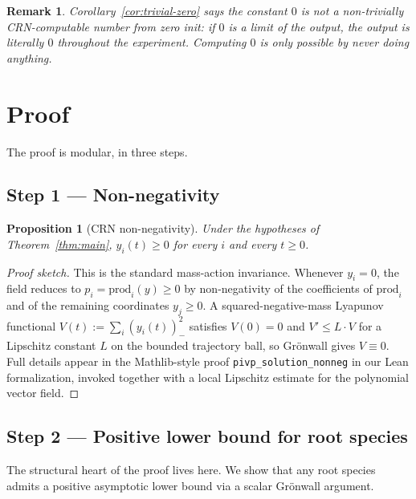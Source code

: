 \documentclass[11pt]{article}
\newtheorem{proposition}[theorem]{Proposition}
\newtheorem{remark}[theorem]{Remark}
\newcommand{\prodpoly}{\mathrm{prod}}
\begin{document}
\begin{remark}
Corollary~\ref{cor:trivial-zero} says the constant $0$ is not a
non-trivially CRN-computable number from zero init: if $0$ is a limit of the
output, the output is literally $0$ throughout the experiment. Computing $0$
is only possible by never doing anything.
\end{remark}

\section{Proof}

The proof is modular, in three steps.

\subsection{Step 1 --- Non-negativity}

\begin{proposition}[CRN non-negativity]\label{prop:nonneg}
Under the hypotheses of Theorem~\ref{thm:main}, $y_i(t) \ge 0$ for every
$i$ and every $t \ge 0$.
\end{proposition}

\begin{proof}[Proof sketch]
This is the standard mass-action invariance. Whenever $y_i = 0$, the field
reduces to $p_i = \prodpoly_i(y) \ge 0$ by non-negativity of the coefficients
of $\prodpoly_i$ and of the remaining coordinates $y_j \ge 0$. A
squared-negative-mass Lyapunov functional $V(t) := \sum_i (y_i(t))_-^2$
satisfies $V(0) = 0$ and $V' \le L \cdot V$ for a Lipschitz constant $L$ on
the bounded trajectory ball, so Gr\"onwall gives $V \equiv 0$. Full details
appear in the Mathlib-style proof \texttt{pivp\_solution\_nonneg} in our Lean
formalization, invoked together with a local Lipschitz estimate for the
polynomial vector field.
\end{proof}

\subsection{Step 2 --- Positive lower bound for root species}

The structural heart of the proof lives here. We show that any root species
admits a positive asymptotic lower bound via a scalar Gr\"onwall argument.
\end{document}
